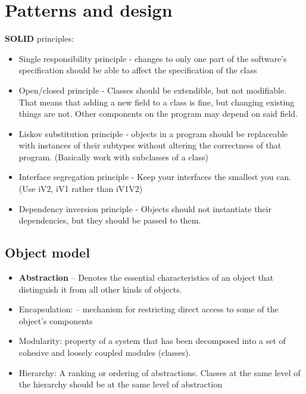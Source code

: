 \documentclass{article}
\begin{document}
\section{Patterns and design}
\begin{flushleft}
\textbf{SOLID} principles:
\begin{itemize}
	\item Single responsibility principle - changes to only one part of the software's specification should be able to affect the specification of the class
	\item Open/closed principle	 -  Classes should be extendible, but not modifiable. That means that adding a new field to a class is fine, but changing existing things are not. Other components on the program may depend on said field.
	\item Liskov substitution principle - objects in a program should be replaceable with instances of their subtypes without altering the correctness of that program. (Basically work with subclasses of a class)
	\item Interface segregation principle - Keep your interfaces the smallest you can. (Use iV2, iV1 rather than iV1V2)
	\item Dependency inversion principle - Objects should not instantiate their dependencies, but they should be passed to them.
\end{itemize}
\end{flushleft}

\subsection{Object model}
\begin{itemize}
	\item \textbf{Abstraction} – Denotes the essential characteristics of an object that distinguish it from all other kinds of objects.
	\item Encapsulation: – mechanism for restricting direct access to some of the object's components
	\item Modularity: property of a system that has been decomposed into a set of cohesive and loosely coupled modules (classes).
	\item Hierarchy: A ranking or ordering of abstractions. Classes at the same level of the hierarchy should be at the same level of abstraction
\end{itemize}
\end{document}
